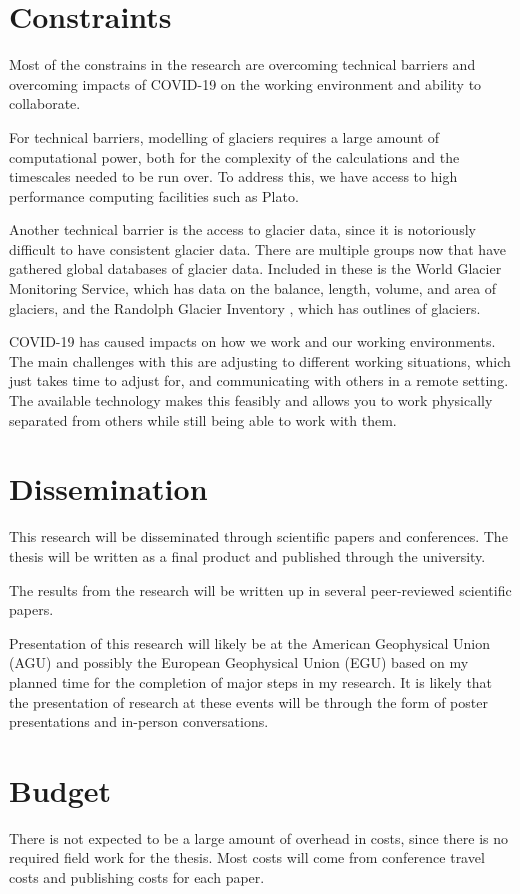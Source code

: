 \documentclass{article}
\begin{document}
\section{Constraints}
Most of the constrains in the research are overcoming technical barriers and overcoming impacts of COVID-19 on the working environment and ability to collaborate.

For technical barriers, modelling of glaciers requires a large amount of computational power, both for the complexity of the calculations and the timescales needed to be run over. To address this, we have access to high performance computing facilities such as Plato.  

Another technical barrier is the access to glacier data, since it is notoriously difficult to have consistent glacier data. There are multiple groups now that have gathered global databases of glacier data. Included in these is the World Glacier Monitoring Service, which has data on the balance, length, volume, and area of glaciers, and the Randolph Glacier Inventory \citep{RGI2017}, which has outlines of glaciers.

COVID-19 has caused impacts on how we work and our working environments. The main challenges with this are adjusting to different working situations, which just takes time to adjust for, and communicating with others in a remote setting. The available technology makes this feasibly and allows you to work physically separated from others while still being able to work with them.

\section{Dissemination}
This research will be disseminated through scientific papers and conferences. The thesis will be written as a final product and published through the university.

The results from the research will be written up in several peer-reviewed scientific papers.

Presentation of this research will likely be at the American Geophysical Union (AGU) and possibly the European Geophysical Union (EGU) based on my planned time for the completion of major steps in my research. It is likely that the presentation of research at these events will be through the form of poster presentations and in-person conversations.

\section{Budget}
There is not expected to be a large amount of overhead in costs, since there is no required field work for the thesis. Most costs will come from conference travel costs and publishing costs for each paper. 
\end{document}
